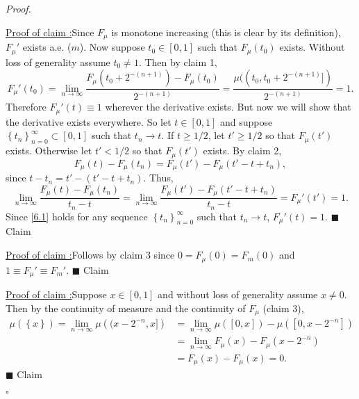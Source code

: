 \documentclass[12pt]{article}
\newcounter{ProofCounter}
\newcounter{ClaimCounter}[ProofCounter]
\newenvironment{Proof}{\stepcounter{ProofCounter}\textit{Proof.}}{\hfill$\square$}
\newenvironment{claim}[1]{\vspace{1mm}\stepcounter{ClaimCounter}\par\noindent\underline{\bf Claim \theClaimCounter:}\space#1}{}
\newenvironment{claimproof}[1]{\par\noindent\underline{Proof of claim \theClaimCounter:}\space#1}{\hfill $\blacksquare$ Claim \theClaimCounter}
\begin{document}
\begin{Proof}
\begin{claimproof}
Since $F_{\mu}$ is monotone increasing (this is clear by its definition), $F_{\mu}'$ exists a.e. ($m$). Now suppose $t_{0} \in [0,1]$ such that
$F_{\mu}(t_{0})$ exists. Without loss of generality assume $t_{0} \neq 1$. Then by claim 1,
\[ F_{\mu}'(t_{0}) = \lim_{n\rightarrow\infty}\frac{F_{\mu}(t_{0} + 2^{-(n+1)}) - F_{\mu}(t_{0})}{2^{-(n+1)}} = \frac{\mu(
(t_{0},t_{0}+2^{-(n+1)}])}{2^{-(n+1)}} = 1. \]
Therefore $F_{\mu}'(t) \equiv 1$ wherever the derivative exists. But now we will show that the derivative exists everywhere. So let $t \in [0,1]$ and
suppose $\left\{ t_{n} \right\}_{n=0}^{\infty} \subset [0,1]$ such that $t_{n} \rightarrow t$. If $t \geq 1/2$, let $t' \geq 1/2$ so that
$F_{\mu}(t')$ exists. Otherwise let $t' < 1/2$ so that $F_{\mu}(t')$ exists. By claim 2,
\[ F_{\mu}(t) - F_{\mu}(t_{n}) = F_{\mu}(t') - F_{\mu}(t' - t + t_{n}), \]
since $t - t_{n} = t' - (t' - t + t_{n})$. Thus, 
\begin{equation}
\lim_{n\rightarrow\infty}\frac{F_{\mu}(t) - F_{\mu}(t_{n})}{t_{n} - t} = \lim_{n\rightarrow\infty}\frac{F_{\mu}(t') - F_{\mu}(t' - t + t_{n})}{t_{n} -
t} = F_{\mu}'(t') = 1.
\label{6.1}
\end{equation}
Since \eqref{6.1} holds for any sequence $\left\{ t_{n} \right\}_{n=0}^{\infty}$ such that $t_{n} \rightarrow t$, $F_{\mu}'(t) = 1$.
\end{claimproof}

\begin{claimproof}
Follows by claim 3 since $0 = F_{\mu}(0) = F_{m}(0)$ and $1 \equiv F_{\mu}' \equiv F_{m}'$.
\end{claimproof}

\begin{claimproof}
Suppose $x \in [0,1]$ and without loss of generality assume $x \neq 0$. Then by the continuity of measure and the continuity of $F_{\mu}$ (claim 3),
\begin{align*}
\mu\left( \left\{ x \right\} \right) = \lim_{n\rightarrow\infty}\mu\left( (x-2^{-n},x] \right) & = \lim_{n\rightarrow\infty}\mu([0,x]) -
\mu([0,x-2^{-n}]) \\
& = \lim_{n\rightarrow\infty}F_{\mu}(x) - F_{\mu}(x - 2^{-n}) \\
& = F_{\mu}(x) - F_{\mu}(x) = 0. 
\end{align*}
\end{claimproof}


\end{Proof}
\end{document}
